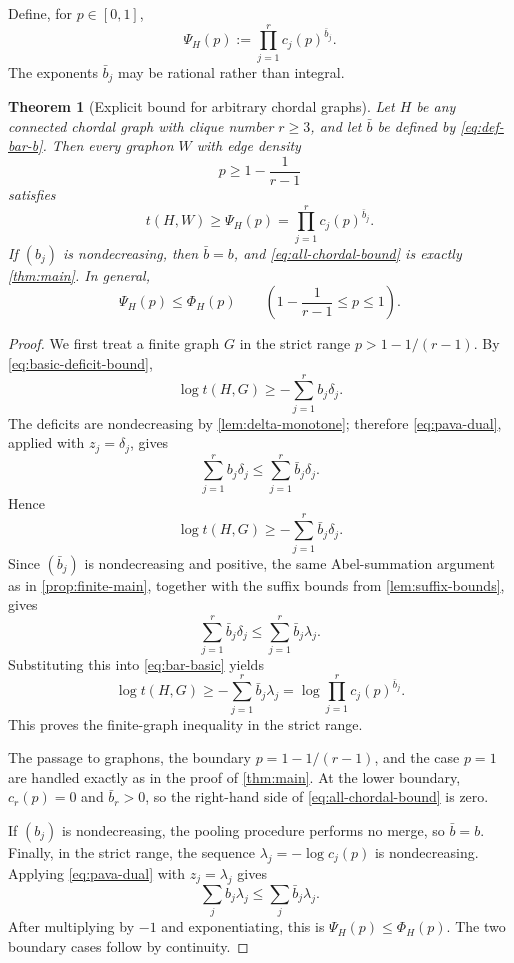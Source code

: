 \documentclass[11pt]{article}
\newtheorem{theorem}{Theorem}[section]
\numberwithin{equation}{section}
\newcommand{\PhiH}{\Phi_H}
\newcommand{\PsiH}{\Psi_H}
\begin{document}
Define, for $p\in[0,1]$,
\begin{equation}
 \PsiH(p)
 :=
 \prod_{j=1}^r c_j(p)^{\bar b_j}.\label{eq:def-Psi}
\end{equation}
The exponents $\bar b_j$ may be rational rather than integral.

\begin{theorem}[Explicit bound for arbitrary chordal graphs]
\label{thm:all-chordal}
Let $H$ be any connected chordal graph with clique number $r\geq3$, and
let $\bar b$ be defined by \eqref{eq:def-bar-b}.  Then every graphon $W$
with edge density
\[
 p\geq1-\frac{1}{r-1}
\]
satisfies
\begin{equation}
 t(H,W)\geq\PsiH(p)
 =\prod_{j=1}^r c_j(p)^{\bar b_j}.\label{eq:all-chordal-bound}
\end{equation}
If $(b_j)$ is nondecreasing, then $\bar b=b$, and
\eqref{eq:all-chordal-bound} is exactly \cref{thm:main}.  In general,
\begin{equation}
 \PsiH(p)\leq\PhiH(p)
 \qquad
 \left(1-\frac{1}{r-1}\leq p\leq1\right).\label{eq:Psi-le-Phi}
\end{equation}
\end{theorem}

\begin{proof}
We first treat a finite graph $G$ in the strict range
$p>1-1/(r-1)$.  By \eqref{eq:basic-deficit-bound},
\[
 \log t(H,G)\geq-\sum_{j=1}^r b_j\delta_j.
\]
The deficits are nondecreasing by \cref{lem:delta-monotone}; therefore
\eqref{eq:pava-dual}, applied with $z_j=\delta_j$, gives
\[
 \sum_{j=1}^r b_j\delta_j
 \leq
 \sum_{j=1}^r\bar b_j\delta_j.
\]
Hence
\begin{equation}
 \log t(H,G)
 \geq
 -\sum_{j=1}^r\bar b_j\delta_j.\label{eq:bar-basic}
\end{equation}
Since $(\bar b_j)$ is nondecreasing and positive, the same Abel-summation
argument as in \cref{prop:finite-main}, together with the suffix bounds
from \cref{lem:suffix-bounds}, gives
\[
 \sum_{j=1}^r\bar b_j\delta_j
 \leq
 \sum_{j=1}^r\bar b_j\lambda_j.
\]
Substituting this into \eqref{eq:bar-basic} yields
\[
 \log t(H,G)
 \geq
 -\sum_{j=1}^r\bar b_j\lambda_j
 =
 \log\prod_{j=1}^r c_j(p)^{\bar b_j}.
\]
This proves the finite-graph inequality in the strict range.

The passage to graphons, the boundary
$p=1-1/(r-1)$, and the case $p=1$ are handled exactly as in the proof of
\cref{thm:main}.  At the lower boundary, $c_r(p)=0$ and
$\bar b_r>0$, so the right-hand side of
\eqref{eq:all-chordal-bound} is zero.

If $(b_j)$ is nondecreasing, the pooling procedure performs no merge, so
$\bar b=b$.  Finally, in the strict range, the sequence
$\lambda_j=-\log c_j(p)$ is nondecreasing.  Applying
\eqref{eq:pava-dual} with $z_j=\lambda_j$ gives
\[
 \sum_j b_j\lambda_j
 \leq
 \sum_j\bar b_j\lambda_j.
\]
After multiplying by $-1$ and exponentiating, this is
$\PsiH(p)\leq\PhiH(p)$.  The two boundary cases follow by continuity.
\end{proof}
\end{document}
